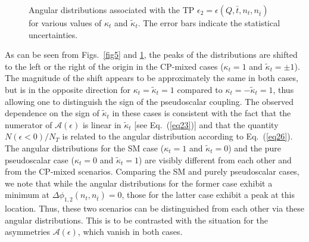 \documentclass[aps,preprint,tightenlines,floatfix,superscriptaddress,nofootinbib,showpacs]{revtex4-1}
\def\tbar{\bar{t}}
\def\kp{\kappa_t}
\def\kpt{\tilde{\kappa}_t}
\def\TPb{\epsilon(Q,\tbar,n_t,n_{\tbar})}
\begin{document}
\begin{center}
\begin{figure}[H]
\hspace*{0.002\textwidth}
\caption{Angular distributions associated with the TP $\epsilon_2 = \TPb$ for
  various values of $\kp$ and $\kpt$. The error bars indicate the statistical
  uncertainties.}
\label{fig6}
\end{figure}
\end{center}
\par As can be seen from Figs.~\ref{fig5} and \ref{fig6}, the
peaks of the 
distributions are shifted to the left or the right of the origin
in the $\mathrm{CP}$-mixed
cases ($\kp =1$ and $\kpt=\pm 1$).
The magnitude of the shift appears to be approximately the
same in both cases, but is in the
opposite direction for $\kp=\kpt=1$ compared to $\kp=-\kpt=1$, thus allowing
one to distinguish
the sign of the pseudoscalar coupling. The observed dependence
on the sign of $\kpt$ in these cases
is consistent with the fact that the numerator of $\mathcal{A}(\epsilon)$
is linear in $\kpt$ [see Eq.~(\ref{eq23})]
and that the quantity $N(\epsilon < 0)/N_T$ is related
to the angular distribution according to Eq.~(\ref{eq26}). The angular
distributions for the SM case ($\kp =1$ and $\kpt=0$) and
the pure pseudoscalar case ($\kp =0$ and $\kpt= 1$) are
visibly different from each other and from the $\mathrm{CP}$-mixed
scenarios. Comparing the SM and purely pseudoscalar cases,
we note that while the angular distributions for the former case
exhibit a minimum at $\Delta\phi_{1,2}(n_t,n_{\tbar})=0$, those
for the latter case exhibit a peak at this location.
Thus, these two scenarios can be distinguished from each other
via these angular distributions.  This is to be contrasted
with the situation for the asymmetries $\mathcal{A}(\epsilon)$, which vanish
in both cases.
\end{document}
